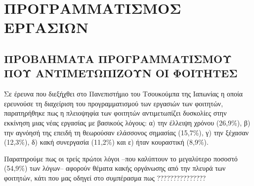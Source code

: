 \chapter{ΠΡΟΓΡΑΜΜΑΤΙΣΜΟΣ ΕΡΓΑΣΙΩΝ}

    \section{ΠΡΟΒΛΗΜΑΤΑ ΠΡΟΓΡΑΜΜΑΤΙΣΜΟΥ ΠΟΥ ΑΝΤΙΜΕΤΩΠΙΖΟΥΝ ΟΙ ΦΟΙΤΗΤΕΣ}
        Σε έρευνα \cite{Fukuzawa2015} που διεξήχθει στο Πανεπιστήμιο του Τσουκούμπα της Ιαπωνίας η οποία ερευνούσε τη διαχείριση του προγραμματισμού των εργασιών των φοιτητών,
            παρατηρήθηκε πως η πλειοψηφία των φοιτητών αντιμετωπίζει δυσκολίες στην εκκίνηση μιας νέας εργασίας με βασικούς λόγους:
            α) την έλλειψη χρόνου (26,9\%), β) την αγνόησή της επειδή τη θεωρούσαν ελάσσονος σημασίας (15,7\%), γ) την ξέχασαν (12,3\%), δ) κακή συνεργασία (11,2\%) και ε) ήταν κουραστική (8,9\%).

        Παρατηρούμε πως οι τρείς πρώτοι λόγοι --που καλύπτουν το μεγαλύτερο ποσοστό (54,9\%) των λόγων-- αφορούν θέματα κακής οργάνωσης από την πλευρά των φοιτητών,
            κάτι που μας οδηγεί στο συμπέρασμα πως ???????????????